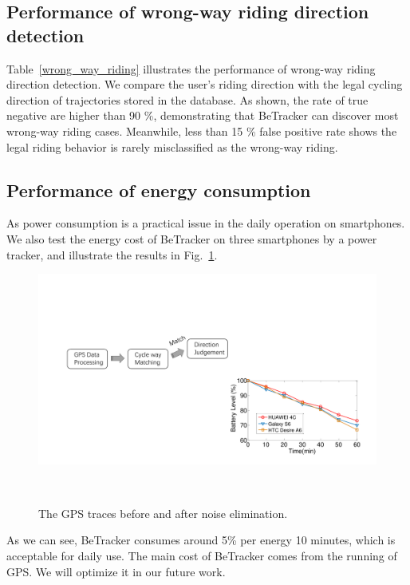\documentclass{sigchi-ext}
\def\sysname{BeTracker }
\begin{document}
\subsection{Performance of wrong-way riding direction detection}
Table~\ref{wrong_way_riding} illustrates the performance of wrong-way riding direction detection. 
We compare the user's riding direction with the legal cycling direction of trajectories stored in the database.  
As shown, the rate of true negative are higher than 90 \%, demonstrating that \sysname can discover most wrong-way riding cases. Meanwhile, less than 15 \% false positive rate shows the legal riding behavior is rarely misclassified as the wrong-way riding.  




\subsection{Performance of energy consumption}
As power consumption is a practical issue in the daily operation on smartphones. We also test the energy cost of \sysname on three smartphones by a power tracker, and illustrate the results in Fig.~\ref{fig:battery}.
\begin{figure}[h]
	\centering
	\includegraphics[width=0.6\columnwidth]{figures/battery.pdf}
	\caption{The GPS traces before and after noise elimination.}~\label{fig:battery}
\end{figure}
As we can see, \sysname consumes around 5\% per energy 10 minutes, which is acceptable for daily use.
The main cost of \sysname comes from the running of GPS. We will optimize it in our future work.
\end{document}
